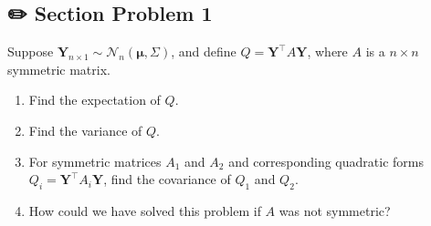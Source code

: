 \documentclass[
  letterpaper,
  DIV=11,
  numbers=noendperiod]{scrreprt}
\theoremstyle{definition}
\theoremstyle{plain}
\theoremstyle{remark}
\begin{document}

\hypertarget{section-problem-1-5}{%
\subsection*{✏️ Section Problem 1}\label{section-problem-1-5}}

Suppose
\(\mathbf{Y}_{n\times 1}\sim \mathcal{N}_n(\mathbf{\mu},\Sigma)\), and
define \(Q=\mathbf{Y}^{\top}A\mathbf{Y}\), where \(A\) is a
\(n \times n\) symmetric matrix.

\begin{enumerate}
\def\labelenumi{(\alph{enumi})}
\item
  Find the expectation of \(Q\).
\item
  Find the variance of \(Q\).
\item
  For symmetric matrices \(A_{1}\) and \(A_{2}\) and corresponding
  quadratic forms \(Q_{i}=\mathbf{Y}^{\top}A_{i}\mathbf{Y}\), find the
  covariance of \(Q_{1}\) and \(Q_{2}\).
\item
  How could we have solved this problem if \(A\) was not symmetric?
\end{enumerate}
\end{document}
